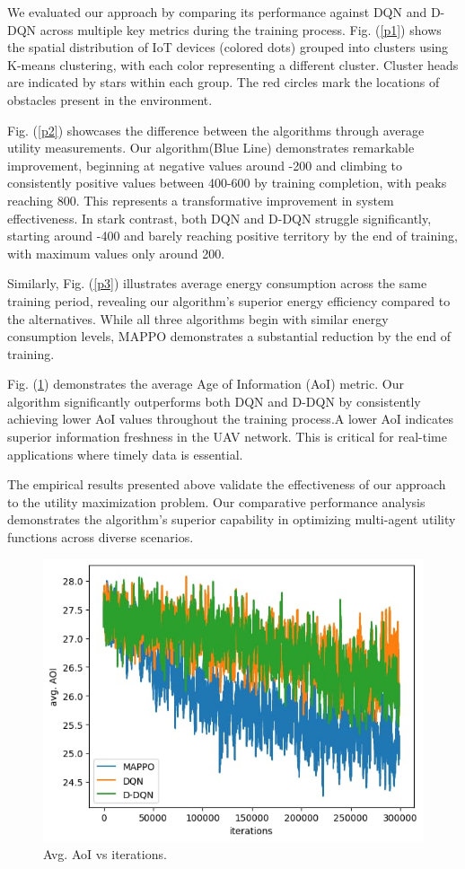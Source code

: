 \documentclass[conference]{IEEEtran}
\begin{document}
We evaluated our approach by comparing its performance against DQN and D-DQN across multiple key metrics during the training process. Fig. (\ref{p1}) shows the spatial distribution of IoT devices (colored dots) grouped into clusters using K-means clustering, with each color representing a different cluster. Cluster heads are indicated by stars within each group. The red circles mark the locations of obstacles present in the environment. 

Fig. (\ref{p2}) showcases the difference between the algorithms through average utility measurements. Our algorithm(Blue Line) demonstrates remarkable improvement, beginning at negative values around -200 and climbing to consistently positive values between 400-600 by training completion, with peaks reaching 800. This represents a transformative improvement in system effectiveness. In stark contrast, both DQN and D-DQN struggle significantly, starting around -400 and barely reaching positive territory by the end of training, with maximum values only around 200. 

Similarly, Fig. (\ref{p3}) illustrates average energy consumption across the same training period, revealing our algorithm's superior energy efficiency compared to the alternatives. While all three algorithms begin with similar energy consumption levels, MAPPO demonstrates a substantial reduction by the end of training. 

Fig. (\ref{p4}) demonstrates the average Age of Information (AoI) metric. Our algorithm significantly outperforms both DQN and D-DQN by consistently achieving lower AoI values throughout the training process.A lower AoI indicates superior information freshness in the UAV network. This is critical for real-time applications where timely data is essential. 

The empirical results presented above validate the effectiveness of our approach to the utility maximization problem. Our comparative performance analysis demonstrates the algorithm's superior capability in optimizing multi-agent utility functions across diverse scenarios.
\begin{figure}
\centerline{\includegraphics[width=1\columnwidth]{AOI_final.png}}
\caption{Avg. AoI vs iterations.}
\label{p4}
\end{figure}
\end{document}
